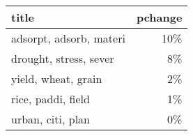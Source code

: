 \begin{tabular}{p{1.2cm}r}
\toprule
                   title &  pchange \\
\midrule
 adsorpt, adsorb, materi &      10\% \\
  drought, stress, sever &       8\% \\
     yield, wheat, grain &       2\% \\
      rice, paddi, field &       1\% \\
       urban, citi, plan &       0\% \\
\bottomrule
\end{tabular}
